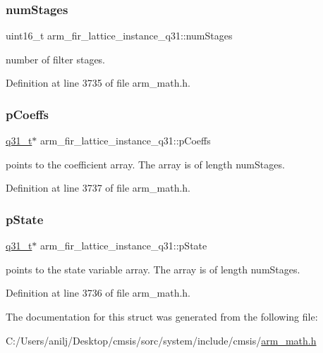 \subsubsection{\texorpdfstring{num\+Stages}{numStages}}
{\footnotesize\ttfamily uint16\+\_\+t arm\+\_\+fir\+\_\+lattice\+\_\+instance\+\_\+q31\+::num\+Stages}

number of filter stages. 

Definition at line 3735 of file arm\+\_\+math.\+h.

\mbox{\label{structarm__fir__lattice__instance__q31_a66c3364bf5863cd45e05f1652c3dc522}} 
\subsubsection{\texorpdfstring{p\+Coeffs}{pCoeffs}}
{\footnotesize\ttfamily \hyperlink{arm__math_8h_adc89a3547f5324b7b3b95adec3806bc0}{q31\+\_\+t}$\ast$ arm\+\_\+fir\+\_\+lattice\+\_\+instance\+\_\+q31\+::p\+Coeffs}

points to the coefficient array. The array is of length num\+Stages. 

Definition at line 3737 of file arm\+\_\+math.\+h.

\mbox{\label{structarm__fir__lattice__instance__q31_a08fe9494ab7cd336b791e9657adadcf6}} 
\subsubsection{\texorpdfstring{p\+State}{pState}}
{\footnotesize\ttfamily \hyperlink{arm__math_8h_adc89a3547f5324b7b3b95adec3806bc0}{q31\+\_\+t}$\ast$ arm\+\_\+fir\+\_\+lattice\+\_\+instance\+\_\+q31\+::p\+State}

points to the state variable array. The array is of length num\+Stages. 

Definition at line 3736 of file arm\+\_\+math.\+h.



The documentation for this struct was generated from the following file\+:\begin{DoxyCompactItemize}
\item 
C\+:/\+Users/anilj/\+Desktop/cmsis/sorc/system/include/cmsis/\hyperlink{arm__math_8h}{arm\+\_\+math.\+h}\end{DoxyCompactItemize}
